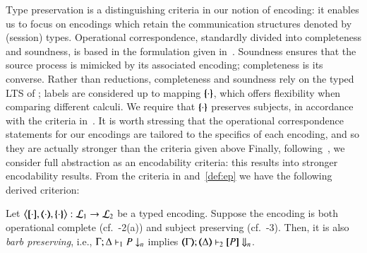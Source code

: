 \smallskip 

\noi Type preservation is a distinguishing criteria in our notion of encoding: it enables us to focus on encodings which retain the communication structures denoted by (session) types.
Operational correspondence, standardly divided into completeness and soundness, is based
in the formulation given in~\cite{DBLP:journals/iandc/Gorla10,DBLP:conf/icalp/LanesePSS10}. 
Soundness ensures that the source process is mimicked 
by its associated encoding; completeness is its converse.
Rather than reductions, completeness and soundness rely on 
the typed LTS of ; labels are considered up to  mapping $\{\!\!\{\cdot\}\!\!\}$, which offers flexibility when comparing different calculi. We require that $\{\!\!\{\cdot\}\!\!\}$ preserves  subjects, in accordance with the criteria in~\cite{DBLP:conf/icalp/LanesePSS10}.
It is worth stressing that 
the operational correspondence statements 
for our encodings 
 are tailored to the specifics of each encoding, and so they
 are actually stronger than the criteria given above
Finally, following~\cite{SangiorgiD:expmpa,DBLP:conf/lics/PalamidessiSVV06,Yoshida96},
we consider full abstraction as an encodability criteria: this results into 
stronger encodability results. 
From the criteria in  and~\ref{def:ep}
we have the following derived criterion: 

\smallskip 

\begin{proposition}\label{p:barbpres}
Let
	$\enco{\map{\cdot}, \mapt{\cdot}, \mapa{\cdot}}: \tyl{L}_1 \to \tyl{L}_2$
	be a typed encoding.
	Suppose the encoding is both
 operational complete (cf.~-2(a)) 
 and subject preserving (cf.~-3).
 Then, it is also \emph{barb preserving}, i.e., 
$\Gamma; \Delta \vdash_1 P \downarrow_{n}$
implies
$\mapt{\Gamma}; \mapt{\Delta} \proves_2 \map{P} \Barb{n}$.
\end{proposition}

